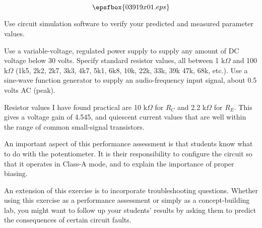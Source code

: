 

$$\epsfbox{03919x01.eps}$$

\vfil \eject






Use circuit simulation software to verify your predicted and measured parameter values.







Use a variable-voltage, regulated power supply to supply any amount of DC voltage below 30 volts.  Specify standard resistor values, all between 1 k$\Omega$ and 100 k$\Omega$ (1k5, 2k2, 2k7, 3k3, 4k7, 5k1, 6k8, 10k, 22k, 33k, 39k 47k, 68k, etc.).  Use a sine-wave function generator to supply an audio-frequency input signal, about 0.5 volts AC (peak).

Resistor values I have found practical are 10 k$\Omega$ for $R_C$ and 2.2 k$\Omega$ for $R_E$.  This gives a voltage gain of 4.545, and quiescent current values that are well within the range of common small-signal transistors.

An important aspect of this performance assessment is that students know what to do with the potentiometer.  It is their responsibility to configure the circuit so that it operates in Class-A mode, and to explain the importance of proper biasing.

An extension of this exercise is to incorporate troubleshooting questions.  Whether using this exercise as a performance assessment or simply as a concept-building lab, you might want to follow up your students' results by asking them to predict the consequences of certain circuit faults.




